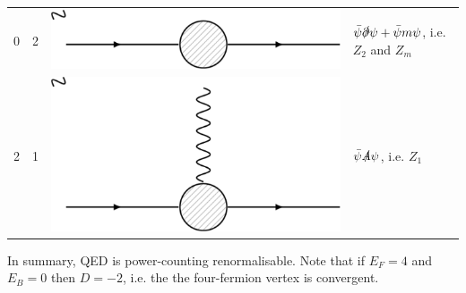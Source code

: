 \begin{table}[h!]
\begin{tabular}{llll}
0     & 2     & \includegraphics[scale=0.2]{figs/pc4.pdf}  & $\bar{\psi}\slashed{\partial}\psi + \bar{\psi}m\psi$, i.e. $Z_2$ and $Z_m$                            \\
2     & 1     & \includegraphics[scale=0.2]{figs/pc5.pdf} & 
$\bar{\psi}\slashed{A}\psi$, i.e. $Z_1$
\end{tabular}
\end{table}
In summary, QED is power-counting renormalisable. Note that if $E_F=4$ and $E_B=0$ then $D=-2$, i.e. the the four-fermion vertex is convergent.

